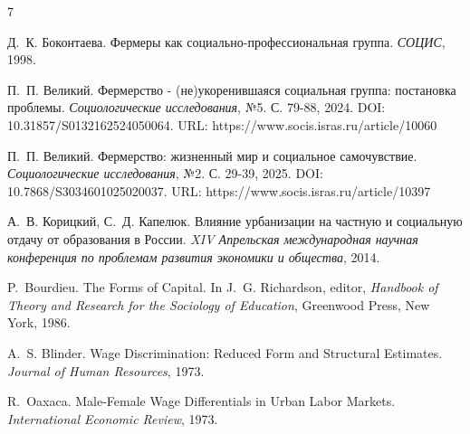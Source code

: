 \documentclass[14pt, a4paper]{article}
\begin{document}
	\begin{thebibliography}{7}
		
		Д.~К. Боконтаева.
		\newblock Фермеры как социально-профессиональная группа.
		\newblock \emph{СОЦИС}, 1998.
		
		П.~П. Великий.
		\newblock Фермерство - (не)укоренившаяся социальная группа: постановка проблемы.
		\newblock \emph{Социологические исследования}, №5. С. 79-88, 2024.
		\newblock DOI: 10.31857/S0132162524050064.
		\newblock URL: https://www.socis.isras.ru/article/10060 
		
		П.~П. Великий.
		\newblock Фермерство: жизненный мир и социальное самочувствие.
		\newblock \emph{Социологические исследования}, №2. С. 29-39, 2025.
		\newblock DOI: 10.7868/S3034601025020037.
		\newblock URL: https://www.socis.isras.ru/article/10397
		
		А.~В. Корицкий, С.~Д. Капелюк.
		\newblock Влияние урбанизации на частную и социальную отдачу от образования в России.
		\newblock \emph{XIV Апрельская международная научная конференция по проблемам развития экономики и общества}, 2014.
				
		P.~Bourdieu.
		\newblock The Forms of Capital.
		\newblock In J.~G. Richardson, editor, \emph{Handbook of Theory and Research for the Sociology of Education}, Greenwood Press, New York, 1986.
		
		A.~S. Blinder.
		\newblock Wage Discrimination: Reduced Form and Structural Estimates.
		\newblock \emph{Journal of Human Resources}, 1973.
		
		R.~Oaxaca.
		\newblock Male-Female Wage Differentials in Urban Labor Markets.
		\newblock \emph{International Economic Review}, 1973.
		
		
		
	\end{thebibliography}
	\newpage
	\appendix
\end{document}
